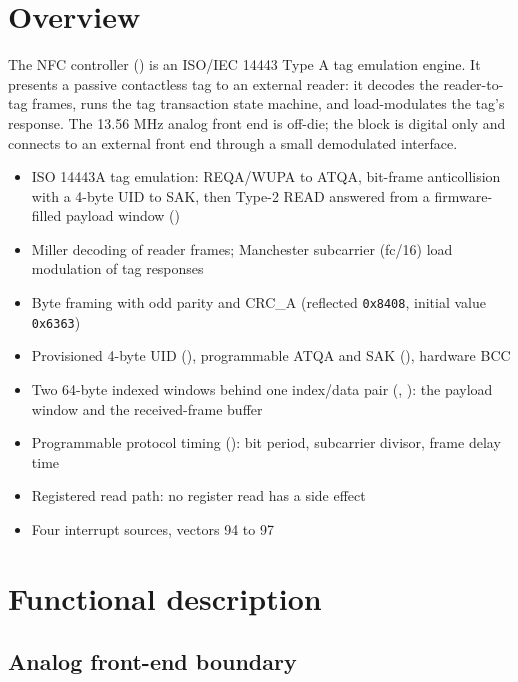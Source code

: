 \section{Overview}

The NFC controller () is an ISO/IEC 14443 Type A tag emulation engine. It presents a passive contactless tag to an external reader: it decodes the reader-to-tag frames, runs the tag transaction state machine, and load-modulates the tag's response. The 13.56 MHz analog front end is off-die; the block is digital only and connects to an external front end through a small demodulated interface.

\begin{itemize}
	\item ISO 14443A tag emulation: REQA/WUPA to ATQA, bit-frame anticollision with a 4-byte UID to SAK, then Type-2 READ answered from a firmware-filled payload window ()
	\item Miller decoding of reader frames; Manchester subcarrier (fc/16) load modulation of tag responses
	\item Byte framing with odd parity and CRC\_A (reflected \texttt{0x8408}, initial value \texttt{0x6363})
	\item Provisioned 4-byte UID (), programmable ATQA and SAK (), hardware BCC
	\item Two 64-byte indexed windows behind one index/data pair (, ): the payload window and the received-frame buffer
	\item Programmable protocol timing (): bit period, subcarrier divisor, frame delay time
	\item Registered read path: no register read has a side effect
	\item Four interrupt sources, vectors 94 to 97
\end{itemize}

\section{Functional description}

\subsection{Analog front-end boundary}

